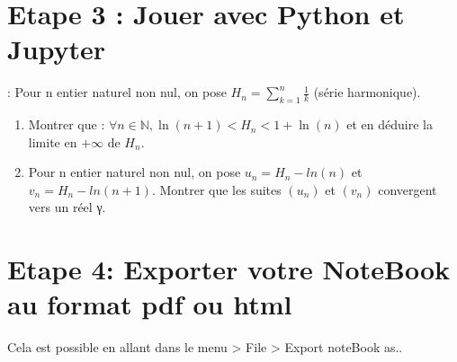\documentclass[letterpaper,10pt,english]{sphinxmanual}
\begin{document}
\section{Etape 3 : Jouer avec Python et Jupyter}
\label{\detokenize{Part1/NoteBookTuto:etape-3-jouer-avec-python-et-jupyter}}
 : Pour n entier naturel non nul, on pose \(H_n = \sum_{k=1}^n \frac{1}{k} \)  (série harmonique).
\begin{enumerate}
%
\item {} 
Montrer que : \(\forall n \in \mathbb{N}, \ln(n + 1) < H_n < 1 + \ln(n)\) et en déduire la limite en \(+\infty\) de \(H_n\).

\item {} 
Pour n entier naturel non nul, on pose \(u_n = H_n − ln(n)\) et \(v_n = H_n − ln(n + 1)\). Montrer que les suites \((u_n)\) et \((v_n)\) convergent vers un réel γ.

\end{enumerate}

\begin{sphinxVerbatim}[commandchars=\\\{\}]
   
       
   
   
    
   
\end{sphinxVerbatim}

\noindent{}


\section{Etape 4: Exporter votre NoteBook au format pdf ou html}
\label{\detokenize{Part1/NoteBookTuto:etape-4-exporter-votre-notebook-au-format-pdf-ou-html}}
Cela est possible en allant dans le menu > File > Export noteBook as..
\end{document}
